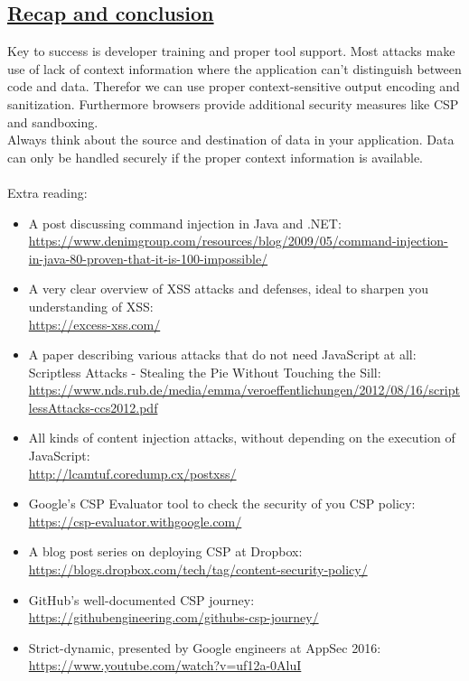 \documentclass[titlepage]{article}
\begin{document}
    \subsection{\href{https://youtu.be/OALvR4Cx3-c}{Recap and conclusion}}
    Key to success is developer training and proper tool support. Most attacks make use of lack of context information where the application can't distinguish between code and data. Therefor we can use proper context-sensitive output encoding and sanitization. Furthermore browsers provide additional security measures like CSP and sandboxing.\\
    Always think about the source and destination of data in your application. Data can only be handled securely if the proper context information is available.\\\\
    Extra reading:
    \begin{itemize}
        \item A post discussing command injection in Java and .NET: \\\url{https://www.denimgroup.com/resources/blog/2009/05/command-injection-in-java-80-proven-that-it-is-100-impossible/}
        \item A very clear overview of XSS attacks and defenses, ideal to sharpen you understanding of XSS: \\\url{https://excess-xss.com/}
        \item A paper describing various attacks that do not need JavaScript at all: Scriptless Attacks - Stealing the Pie Without Touching the Sill: \\\url{https://www.nds.rub.de/media/emma/veroeffentlichungen/2012/08/16/scriptlessAttacks-ccs2012.pdf}
        \item All kinds of content injection attacks, without depending on the execution of JavaScript: \\\url{http://lcamtuf.coredump.cx/postxss/}
        \item Google's CSP Evaluator tool to check the security of you CSP policy: \\\url{https://csp-evaluator.withgoogle.com/}
        \item A blog post series on deploying CSP at Dropbox: \\\url{https://blogs.dropbox.com/tech/tag/content-security-policy/}
        \item GitHub's well-documented CSP journey: \\\url{https://githubengineering.com/githubs-csp-journey/}
        \item Strict-dynamic, presented by Google engineers at AppSec 2016: \\\url{https://www.youtube.com/watch?v=uf12a-0AluI}
    \end{itemize}
    \newpage
\end{document}
